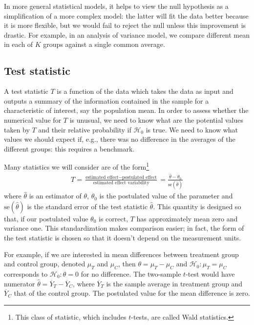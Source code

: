 \documentclass[
  11pt,
  letterpaper,
]{scrbook}
\theoremstyle{definition}
\theoremstyle{definition}
\theoremstyle{remark}
\begin{document}
In more general statistical models, it helps to view the null hypothesis
as a simplification of a more complex model: the latter will fit the
data better because it is more flexible, but we would fail to reject the
null unless this improvement is drastic. For example, in an analysis of
variance model, we compare different mean in each of \(K\) groups
against a single common average.

\subsection{Test statistic}\label{test-statistic}

A test statistic \(T\) is a function of the data which takes the data as
input and outputs a summary of the information contained in the sample
for a characteristic of interest, say the population mean. In order to
assess whether the numerical value for \(T\) is unusual, we need to know
what are the potential values taken by \(T\) and their relative
probability if \(\mathscr{H}_0\) is true. We need to know what values we
should expect if, e.g., there was no difference in the averages of the
different groups: this requires a benchmark.

Many statistics we will consider are of the form\footnote{This class of
  statistic, which includes \(t\)-tests, are called Wald statistics.}
\begin{align*}
T = \frac{\text{estimated effect}- \text{postulated effect}}{\text{estimated effect variability}} = \frac{\widehat{\theta} - \theta_0}{\mathrm{se}(\widehat{\theta})}
\end{align*} where \(\widehat{\theta}\) is an estimator of \(\theta\),
\(\theta_0\) is the postulated value of the parameter and
\(\mathrm{se}(\widehat{\theta})\) is the standard error of the test
statistic \(\widehat{\theta}\). This quantity is designed so that, if
our postulated value \(\theta_0\) is correct, \(T\) has approximately
mean zero and variance one. This standardization makes comparison
easier; in fact, the form of the test statistic is chosen so that it
doesn't depend on the measurement units.

For example, if we are interested in mean differences between treatment
group and control group, denoted \(\mu_T\) and \(\mu_C\), then
\(\theta = \mu_T-\mu_C\) and \(\mathscr{H}_0: \mu_T = \mu_C\)
corresponds to \(\mathscr{H}_0: \theta = 0\) for no difference. The
two-sample \(t\)-test would have numerator
\(\widehat{\theta} = \overline{Y}_T - \overline{Y}_C\), where
\(\overline{Y}_T\) is the sample average in treatment group and
\(\overline{Y}_C\) that of the control group. The postulated value for
the mean difference is zero.
\end{document}
